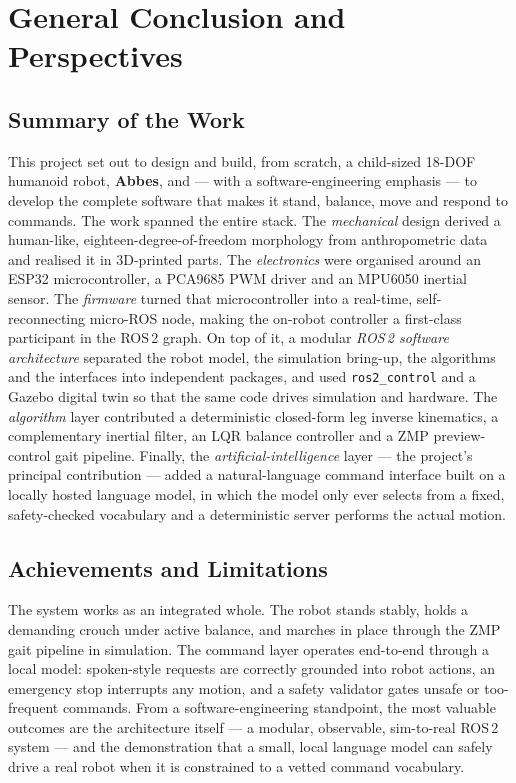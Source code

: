 \chapter{General Conclusion and Perspectives}
\label{chap:conclusion}

\section{Summary of the Work}
This project set out to design and build, from scratch, a child-sized
18-DOF humanoid robot, \textbf{Abbes}, and --- with a software-engineering
emphasis --- to develop the complete software that makes it stand, balance,
move and respond to commands. The work spanned the entire stack. The
\emph{mechanical} design derived a human-like, eighteen-degree-of-freedom
morphology from anthropometric data and realised it in 3D-printed parts.
The \emph{electronics} were organised around an ESP32 microcontroller, a
PCA9685 PWM driver and an MPU6050 inertial sensor. The \emph{firmware}
turned that microcontroller into a real-time, self-reconnecting micro-ROS
node, making the on-robot controller a first-class participant in the
ROS\,2 graph. On top of it, a modular \emph{ROS\,2 software architecture}
separated the robot model, the simulation bring-up, the algorithms and the
interfaces into independent packages, and used \texttt{ros2\_control} and a
Gazebo digital twin so that the same code drives simulation and hardware.
The \emph{algorithm} layer contributed a deterministic closed-form leg
inverse kinematics, a complementary inertial filter, an LQR balance
controller and a ZMP preview-control gait pipeline. Finally, the
\emph{artificial-intelligence} layer --- the project's principal
contribution --- added a natural-language command interface built on a
locally hosted language model, in which the model only ever selects from a
fixed, safety-checked vocabulary and a deterministic server performs the
actual motion.

\section{Achievements and Limitations}
The system works as an integrated whole. The robot stands stably, holds a
demanding crouch under active balance, and marches in place through the ZMP
gait pipeline in simulation. The command layer operates end-to-end through
a local model: spoken-style requests are correctly grounded into robot
actions, an emergency stop interrupts any motion, and a safety validator
gates unsafe or too-frequent commands. From a software-engineering
standpoint, the most valuable outcomes are the architecture itself --- a
modular, observable, sim-to-real ROS\,2 system --- and the demonstration
that a small, local language model can safely drive a real robot when it is
constrained to a vetted command vocabulary.

